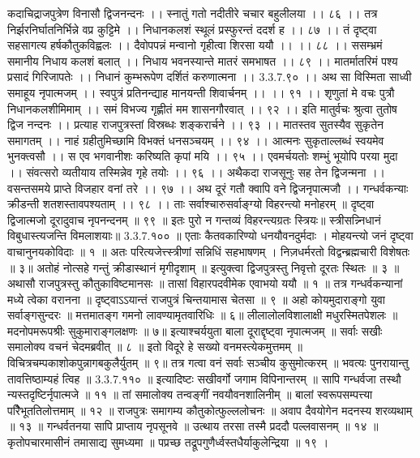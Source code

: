 कदाचिद्राजपुत्रेण विनासौ द्विजनन्दनः ।।
स्नातुं गतो नदीतीरे चचार बहुलीलया ।। ८६ ।।
तत्र निर्झरनिर्घातनिर्भिन्ने वप्र कुट्टिमे ।।
निधानकलशं स्थूलं प्रस्फुरन्तं ददर्श ह ।। ८७ ।।
तं दृष्ट्वा सहसागत्य हर्षकौतुकविह्वलः ।।
दैवोपपन्नं मन्वानो गृहीत्वा शिरसा ययौ ।। ।। ८८ ।।
ससम्भ्रमं समानीय निधाय कलशं बलात् ।।
निधाय भवनस्यान्ते मातरं समभाषत ।। ८९ ।।
मातर्मातरिमं पश्य प्रसादं गिरिजापतेः ।।
निधानं कुम्भरूपेण दर्शितं करुणात्मना ।। 3.3.7.९० ।।
अथ सा विस्मिता साध्वी समाहूय नृपात्मजम् ।।
स्वपुत्रं प्रतिनन्द्याह मानयन्ती शिवार्चनम् ।। ।। ९१ ।।
शृणुतां मे वचः पुत्रौ निधानकलशीमिमाम् ।।
समं विभज्य गृह्णीतं मम शासनगौरवात् ।। ९२ ।।
इति मातुर्वचः श्रुत्वा तुतोष द्विज नन्दनः ।।
प्रत्याह राजपुत्रस्तां विस्रब्धः शङ्करार्चने ।। ९३ ।।
मातस्तव सुतस्यैव सुकृतेन समागतम् ।।
नाहं ग्रहीतुमिच्छामि विभक्तं धनसञ्चयम् ।। ९४ ।।
आत्मनः सुकृताल्लब्धं स्वयमेव भुनक्त्वसौ ।।
स एव भगवानीशः करिष्यति कृपां मयि ।। ९५ ।।
एवमर्चयतोः शम्भुं भूयोपि परया मुदा ।।
संवत्सरो व्यतीयाय तस्मिन्नेव गृहे तयोः ।। ९६ ।।
अथैकदा राजसूनुः सह तेन द्विजन्मना ।।
वसन्तसमये प्राप्ते विजहार वनां तरे ।। ९७ ।।
अथ दूरं गतौ क्वापि वने द्विजनृपात्मजौ ।।
गन्धर्वकन्याः क्रीडन्ती शतशस्तावपश्यताम् ।। ९८ ।।
ताः सर्वाश्चारुसर्वाङ्ग्यो विहरन्त्यो मनोहरम् ॥
दृष्ट्वा द्विजात्मजो दूरादुवाच नृपनन्दनम् ॥ ९९ ॥
इतः पुरो न गन्तव्यं विहरन्त्यग्रतः स्त्रियः॥
स्त्रीसन्न्निधानं विबुधास्त्यजन्ति विमलाशयाः॥ 3.3.7.१०० ॥
एताः कैतवकारिण्यो धनयौवनदुर्मदाः ।
मोहयन्त्यो जनं दृष्ट्वा वाचानुनयकोविदाः ॥ १ ॥
अतः परित्यजेत्त्स्त्रीणां सन्निधिं सहभाषणम् ।
निज़धर्मरतो विद्वन्ब्रह्मचारी विशेषतः ॥ ३॥
अतोहं नोत्सहे गन्तुं क्रीडास्थानं मृगीदृशाम् ॥
इत्युक्त्वा द्विजपुत्रस्तु निवृत्तो दूरतः स्थितः ॥ ३ ॥
अथासौ राजपुत्रस्तु कौतुकाविष्टमानसः ॥
तासां विहारपदवीमेक एवाभयो ययौ ॥ १ ॥
तत्र गन्धर्वकन्यानां मध्ये त्वेका वरानना ॥
दृष्ट्वाऽऽयान्तं राजपुत्रं चिन्तयामास चेतसा ॥ ९ ॥
अहो कोयमुदाराङ्गो युवा सर्वाङ्गसुन्दरः ॥
मत्तमातङ्ग गमनो लावण्यामृतवारिधिः ॥ ६॥
लीलालोलविशालाक्षी मधुरस्मितपेशलः ॥
मदनोपमरूपश्रीः सुकुमाराङ्गलक्षणः ॥ ७॥
इत्याश्चर्ययुता बाला दूराद्दृष्ट्वा नृपात्मजम् ॥
सर्वाः सखीः समालोक्य वचनं चेदमब्रवीत् ॥ ८ ॥
इतो विदूरे हे सख्यो वनमस्त्येकमुत्तमम् ॥
विचित्रचम्पकाशोकपुन्नागबकुलैर्युतम् ॥ ९॥
तत्र गत्वा वनं सर्वाः सञ्चीय कुसुमोत्करम् ॥
भवत्यः पुनरायान्तु तावत्तिष्ठाम्यहं त्विह ॥ 3.3.7.११० ॥
इत्यादिष्टः सखीवर्गो जगाम विपिनान्तरम् ॥
सापि गन्धर्वजा तस्थौ न्यस्तदृष्टिर्नृपात्मजे ॥ ११ ॥
तां समालोक्य तन्वङ्गीं नवयौवनशालिनीम् ॥
बालां स्वरूपसम्पत्त्या परैिभूततिलोत्तमाम् ॥ १२ ॥
राजपुत्रः समागम्य कौतुकोत्फुल्ललोचनः ॥
अवाप दैवयोगेन मदनस्य शरव्यथाम् ॥ १३ ॥
गन्धर्वतनया सापि प्राप्ताय नृपसूनवे ॥
उत्थाय तरसा तस्मै प्रददौ पल्लवासनम् ॥ १४ ॥
कृतोपचारमासीनं तमासाद्य सुमध्यमा ॥
पप्रच्छ तद्रूपगुणैर्ध्वस्तधैर्याकुलेन्द्रिया ॥ १९ ।
